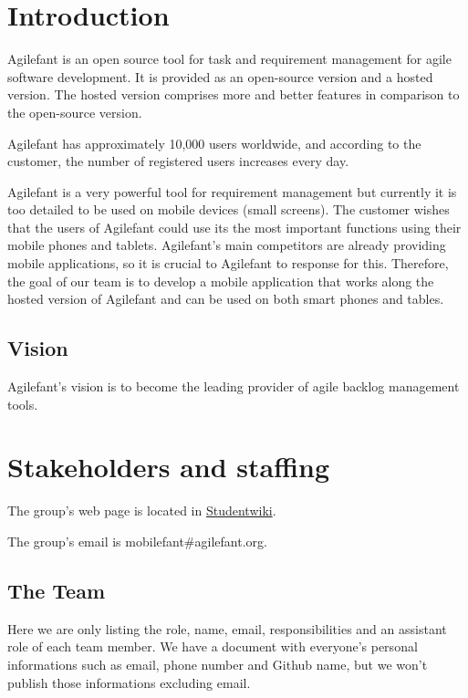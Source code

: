 \section{Introduction}
Agilefant is an open source tool for task and requirement management for agile 
software development. It is provided as an open-source version and a hosted 
version. The hosted version comprises more and better features in comparison to 
the open-source version.

Agilefant has approximately 10,000 users worldwide, and according to the 
customer, the number of registered users increases every day. 
 
Agilefant is a very powerful tool for requirement management but currently it 
is too detailed to be used on mobile devices (small screens). The customer 
wishes that the users of Agilefant could use its the most important functions 
using their mobile phones and tablets. Agilefant's main competitors are already 
providing mobile applications, so it is crucial to Agilefant to response for 
this. Therefore, the goal of our team is to develop a mobile application that 
works along the hosted version of Agilefant and can be used on both smart 
phones and tables.

\subsection{Vision}

Agilefant's vision is to become the leading provider of agile backlog management tools.

\section{Stakeholders and staffing}

The group's web page is located in 
\href{https://studentwiki.aalto.fi/display/MOB/Mobilefant+Home}{Studentwiki}. 

The group's email is mobilefant\#agilefant.org.

\subsection{The Team}

Here we are only listing the role, name, email, responsibilities and an 
assistant role of each team member. We have a document with everyone's personal 
informations such as email, phone number and Github name, but we won't publish 
those informations excluding email.

